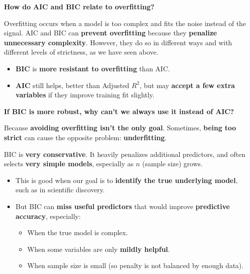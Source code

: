\begin{flushleft}
    \textcolor{Red2}{ \textbf{How do AIC and BIC relate to overfitting?}}
\end{flushleft}
Overfitting occurs when a model is too complex and fits the noise instead of the signal. AIC and BIC can \textbf{prevent overfitting} because they \textbf{penalize unnecessary complexity}. However, they do so in different ways and with different levels of strictness, as we have seen above.
\begin{itemize}
    \item[\textcolor{Green3}{\faIcon{shield-alt}}] \textbf{BIC} is \textbf{more resistant to overfitting} than AIC.
    \item[\textcolor{Red2}{\faIcon{exclamation}}] \textbf{AIC} still helps, better than Adjusted $R^2$, but may \textbf{accept a few extra variables} if they improve training fit slightly.
\end{itemize}

\highspace
\begin{flushleft}
    \textcolor{Green3}{ \textbf{If BIC is more robust, why can't we always use it instead of AIC?}}
\end{flushleft}
Because \textbf{avoiding overfitting isn't the only goal}. Sometimes, \textbf{being too strict} can cause the opposite problem: \textbf{underfitting}.

\highspace
BIC is \textbf{very conservative}. It heavily penalizes additional predictors, and often selects \textbf{very simple models}, especially as $n$ (sample size) grows.
\begin{itemize}
    \item[\textcolor{Green3}{\faIcon{check-circle}}] This is good when our goal is to \textbf{identify the true underlying model}, such as in scientific discovery.
    \item[\textcolor{Red2}{\faIcon{times-circle}}] But BIC can \textbf{miss useful predictors} that would improve \textbf{predictive accuracy}, especially:
    \begin{itemize}
        \item When the true model is complex.
        \item When some variables are only \textbf{mildly helpful}.
        \item When sample size is small (so penalty is not balanced by enough data).
    \end{itemize}
\end{itemize}

